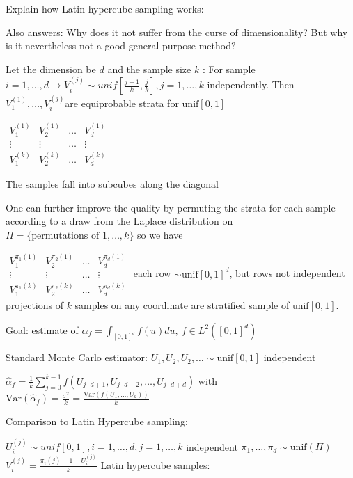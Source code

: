 Explain how Latin hypercube sampling works:

Also answers:
Why does it not suffer from the curse of dimensionality? But why is it nevertheless
not a good general purpose method?


Let the dimension be \( d \) and the sample size \( k \) :
For sample \( i = 1, \dots, d \rightarrow V_i^{(j)} \sim unif[\frac{j-1}{k}, \frac{j}{k}], j = 1, \dots, k \) independently.
Then \( V_1^{(1)}, \dots, V_i^{(j)} \)are equiprobable strata for \( \text{unif}[0,1] \)

\(
\begin{array}{cccc}
V_1^{(1)} & V_2^{(1)} & \dots & V_d^{(1)} \\
\vdots & \vdots & \dots & \vdots \\
V_1^{(k)} & V_2^{(k)} & \dots & V_d^{(k)} 
\end{array}
\)

The samples fall into subcubes along the diagonal

One can further improve the quality by permuting the strata for each sample
according to a draw from the Laplace distribution on \( \Pi = \{\text{permutations of } 1, \dots, k \}\)
so we have

\(
\begin{array}{cccc}
V_1^{\pi_1(1)} & V_2^{\pi_2(1)} & \dots & V_d^{\pi_d(1)} \\
\vdots & \vdots & \dots & \vdots \\
V_1^{\pi_1(k)} & V_2^{\pi_2(k)} & \dots & V_d^{\pi_d(k)} 
\end{array}
\)
each row \( \sim \text{unif}[0, 1]^d \), but rows not independent
projections of \( k \) samples on any coordinate are stratified sample of \( \text{unif}[0, 1] \).

Goal: estimate of \( \alpha_f = \int_{[0,1]^d} f(u) du,\ f \in L^2([0,1]^d) \)

Standard Monte Carlo estimator: \( U_1, U_2, U_2, \dots \sim \text{unif}[0,1] \) independent 

\( \hat{\alpha}_f = \frac{1}{k} \sum_{j=0}^{k-1} f(U_{j \cdot d + 1}, U_{j \cdot d + 2}, \dots, U_{j \cdot d + d})\) with 
\(\text{Var}(\hat{\alpha}_f) = \frac{\sigma^2}{k} = \frac{\text{Var}(f(U_1, \dots, U_d))}{k} \)

Comparison to Latin Hypercube sampling:

\( U_i^{(j)} \sim unif[0,1], i = 1, \dots, d, j = 1, \dots, k\) independent \( \pi_1, \dots, \pi_d \sim \text{unif}(\Pi)\)
\( V_i^{(j)} = \frac{\pi_i(j) - 1 + U_i^{(j)}}{k} \)
Latin hypercube samples:

